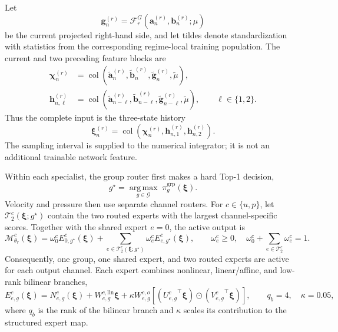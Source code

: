Let
\begin{equation}
  \bm g_n^{(r)}
  =\mathcal F_r^G\!\left(
      \bm a_n^{(r)},\bm b_n^{(r)};\mu
    \right)
  \label{eq:app_galerkin_feature}
\end{equation}
be the current projected right-hand side, and let tildes denote
standardization with statistics from the corresponding regime-local training
population. The current and two preceding feature blocks are
\begin{align}
  \bm\chi_n^{(r)}
  &=\operatorname{col}\!\left(
      \widetilde{\bm a}_n^{(r)},
      \widetilde{\bm b}_n^{(r)},
      \widetilde{\bm g}_n^{(r)},
      \widetilde\mu
    \right),
  \label{eq:app_current_feature_block}\\
  \bm h_{n,\ell}^{(r)}
  &=\operatorname{col}\!\left(
      \widetilde{\bm a}_{n-\ell}^{(r)},
      \widetilde{\bm b}_{n-\ell}^{(r)},
      \widetilde{\bm g}_{n-\ell}^{(r)},
      \widetilde\mu
    \right),
  \qquad \ell\in\{1,2\}.
  \label{eq:app_history_feature_blocks}
\end{align}
Thus the complete input is the three-state history
\begin{equation}
  \bm\xi_n^{(r)}
  =\operatorname{col}\!\left(
      \bm\chi_n^{(r)},\bm h_{n,1}^{(r)},\bm h_{n,2}^{(r)}
    \right).
  \label{eq:app_specialist_features}
\end{equation}
The sampling interval is supplied to the numerical integrator; it is not an
additional trainable network feature.

Within each specialist, the group router first makes a hard Top-1 decision,
\begin{equation}
  g^\star
  =\underset{g\in\mathcal G}{\operatorname{arg\,max}}
    \;\pi_g^{\mathrm{grp}}(\bm\xi).
  \label{eq:app_group_top1}
\end{equation}
Velocity and pressure then use separate channel routers. For
$c\in\{u,p\}$, let $\mathcal T_2^c(\bm\xi;g^\star)$ contain the two routed
experts with the largest channel-specific scores. Together with the shared
expert $e=0$, the active output is
\begin{equation}
  \mathcal M^c_{\theta_r}(\bm\xi)
  =\omega_0^c E^c_{0,g^\star}(\bm\xi)
  +\sum_{e\in\mathcal T_2^c(\bm\xi;g^\star)}
     \omega_e^c E^c_{e,g^\star}(\bm\xi),
  \qquad
  \omega_e^c\geq0,
  \quad
  \omega_0^c+\sum_{e\in\mathcal T_2^c}\omega_e^c=1.
  \label{eq:app_channel_sparse_moe}
\end{equation}
Consequently, one group, one shared expert, and two routed experts are active
for each output channel. Each expert combines nonlinear, linear/affine, and
low-rank bilinear branches,
\begin{equation}
  E^c_{e,g}(\bm\xi)
  =N^c_{e,g}(\bm\xi)
   +W^{c,\mathrm{lin}}_{e,g}\bm\xi
   +\kappa W^{c,o}_{e,g}
    \left[
      \left({U^c_{e,g}}^\top\bm\xi\right)
      \odot
      \left({V^c_{e,g}}^\top\bm\xi\right)
    \right],
  \qquad q_b=4,\quad \kappa=0.05,
  \label{eq:app_structured_expert}
\end{equation}
where $q_b$ is the rank of the bilinear branch and $\kappa$ scales its
contribution to the structured expert map.

